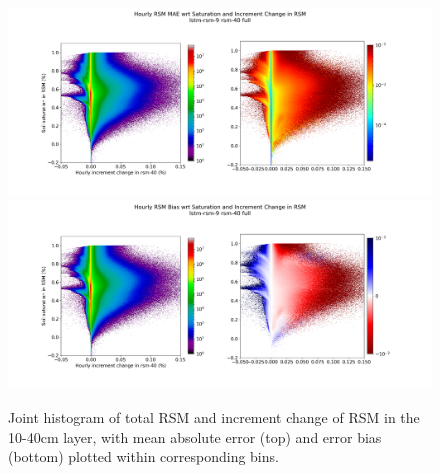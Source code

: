\begin{figure}[hp!]
    \centering

    \includegraphics[width=.96\linewidth,draft=false]{figures/grid-eval_lstm-rsm-9_full/eval-grid_full_lstm-rsm-9_rsm-40_hist-state-increment_abs-err.png}
    \includegraphics[width=.96\linewidth,draft=false]{figures/grid-eval_lstm-rsm-9_full/eval-grid_full_lstm-rsm-9_rsm-40_hist-state-increment_bias.png}

    \caption{Joint histogram of total RSM and increment change of RSM in the 10-40cm layer, with mean absolute error (top) and error bias (bottom) plotted within corresponding bins.}
    \label{acclstm-rsm-9-sihist-rsm-40}
\end{figure}

